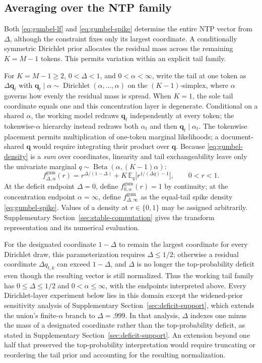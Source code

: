 \documentclass[11pt]{article}
\newcommand{\E}{\mathbb E}
\begin{document}
\subsection{Averaging over the NTP family}
\label{sec:tail-prior}

Both \eqref{eq:gumbel-lf} and \eqref{eq:gumbel-spike} determine the entire NTP vector from $\Delta$, although the constraint fixes only its largest coordinate.  A conditionally symmetric Dirichlet prior allocates the residual mass across the remaining $K=M-1$ tokens.  This permits variation within an explicit tail family.

For $K=M-1\ge2$, $0<\Delta<1$, and $0<\alpha<\infty$, write the tail at one token as $\Delta\bm q_t$ with $\bm q_t\mid\alpha\sim\operatorname{Dirichlet}(\alpha,\ldots,\alpha)$ on the $(K-1)$-simplex, where $\alpha$ governs how evenly the residual mass is spread.  When $K=1$, the sole tail coordinate equals one and this concentration layer is degenerate.  Conditional on a shared $\alpha$, the working model redraws $\bm q_t$ independently at every token; the tokenwise-$\alpha$ hierarchy instead redraws both $\alpha_t$ and then $\bm q_t\mid\alpha_t$.  The tokenwise placement permits multiplication of one-token marginal likelihoods; a document-shared $\bm q$ would require integrating their product over $\bm q$.  Because \eqref{eq:gumbel-density} is a \emph{sum} over coordinates, linearity and tail exchangeability leave only the univariate marginal $q\sim\operatorname{Beta}(\alpha,(K-1)\alpha)$:
\begin{equation}
  f^{\mathrm{gum}}_{\Delta,\alpha}(r)
  =r^{\Delta/(1-\Delta)}
   +K\,\E_q\big[r^{1/(\Delta q)-1}\big],
  \qquad 0<r<1.
  \label{eq:gumbel-dirichlet}
\end{equation}
At the deficit endpoint $\Delta=0$, define $f^{\mathrm{gum}}_{0,\alpha}(r)=1$ by continuity; at the concentration endpoint $\alpha=\infty$, define $f^{\mathrm{gum}}_{\Delta,\infty}$ as the equal-tail spike density \eqref{eq:gumbel-spike}.  Values of a density at $r\in\{0,1\}$ may be assigned arbitrarily.  Supplementary Section~\ref{sec:stable-computation} gives the transform representation and its numerical evaluation.

For the designated coordinate $1-\Delta$ to remain the largest coordinate for every Dirichlet draw, this parameterization requires $\Delta\le1/2$; otherwise a residual coordinate $\Delta q_{t,k}$ can exceed $1-\Delta$, and $\Delta$ is no longer the top-probability deficit even though the resulting vector is still normalized.  Thus the working tail family has $0\le\Delta\le1/2$ and $0<\alpha\le\infty$, with the endpoints interpreted above.  Every Dirichlet-layer experiment below lies in this domain except the widened-prior sensitivity analysis of Supplementary Section~\ref{sec:deficit-support}, which extends the union's finite-$\alpha$ branch to $\Delta=.999$.  In that analysis, $\Delta$ indexes one minus the mass of a designated coordinate rather than the top-probability deficit, as stated in Supplementary Section~\ref{sec:deficit-support}.  An extension beyond one half that preserved the top-probability interpretation would require truncating or reordering the tail prior and accounting for the resulting normalization.
\end{document}
